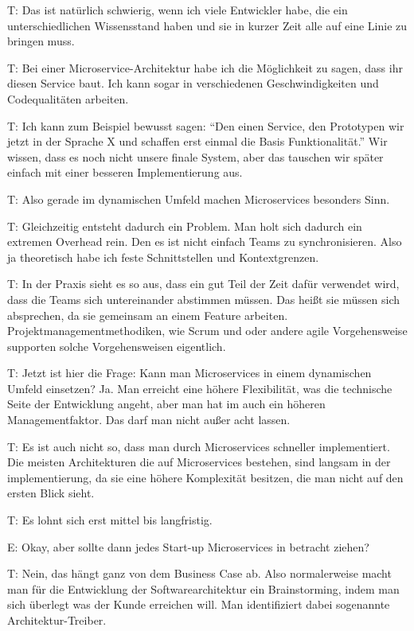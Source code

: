 T: Das ist natürlich schwierig, wenn ich viele Entwickler habe, die ein unterschiedlichen Wissensstand haben und sie in kurzer Zeit alle auf eine Linie zu bringen muss.

\label{appendix:t-7}
T: Bei einer Microservice-Architektur habe ich die Möglichkeit zu sagen, dass ihr diesen Service baut. Ich kann sogar in verschiedenen Geschwindigkeiten und Codequalitäten arbeiten.

T: Ich kann zum Beispiel bewusst sagen: “Den einen Service, den Prototypen wir jetzt in der Sprache X und schaffen erst einmal die Basis Funktionalität.” Wir wissen, dass es noch nicht unsere finale System, aber das tauschen wir später einfach mit einer besseren Implementierung aus.

\label{appendix:t-8}
T: Also gerade im dynamischen Umfeld machen Microservices besonders Sinn.

\label{appendix:t-9}
T: Gleichzeitig entsteht dadurch ein Problem. Man holt sich dadurch ein extremen Overhead rein. Den es ist nicht einfach Teams zu synchronisieren. Also ja theoretisch habe ich feste Schnittstellen und Kontextgrenzen.

\label{appendix:t-10}
T: In der Praxis sieht es so aus, dass ein gut Teil der Zeit dafür verwendet wird, dass die Teams sich untereinander abstimmen müssen. Das heißt sie müssen sich absprechen, da sie gemeinsam an einem Feature arbeiten. Projektmanagementmethodiken, wie Scrum und oder andere agile Vorgehensweise supporten solche Vorgehensweisen eigentlich.

\label{appendix:t-11} \label{appendix:t-12}
T: Jetzt ist hier die Frage: Kann man Microservices in einem dynamischen Umfeld einsetzen?  Ja. Man erreicht eine höhere Flexibilität, was die technische Seite der Entwicklung angeht, aber man hat im auch ein höheren Managementfaktor. Das darf man nicht außer acht lassen.

T: Es ist auch nicht so, dass man durch Microservices schneller implementiert. Die meisten Architekturen die auf Microservices bestehen, sind langsam in der implementierung, da sie eine höhere Komplexität besitzen, die man nicht auf den ersten Blick sieht.

\label{appendix:t-13}
T: Es lohnt sich erst mittel bis langfristig.

E: Okay, aber sollte dann jedes Start-up Microservices in betracht ziehen?

\label{appendix:t-14}
T: Nein, das hängt ganz von dem Business Case ab. Also normalerweise macht man für die Entwicklung der Softwarearchitektur ein Brainstorming, indem man sich überlegt was der Kunde erreichen will. Man identifiziert dabei sogenannte Architektur-Treiber.

